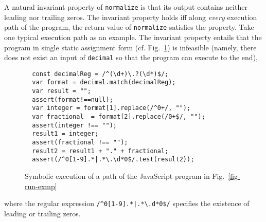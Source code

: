 A natural invariant property of {\tt normalize} is that its output contains neither leading nor trailing zeros. The invariant property holds iff  along \emph{every} execution path of the program, the return value of {\tt normalize} satisfies the property. 
%
Take one typical execution path as an example. %
The invariant property entails that the  program in single static assignment form (cf. Fig.~\ref{fig-run-exmp-path}) is infeasible (namely, there does not exist an input of {\tt decimal} so that the program can execute to the end), 
\begin{figure}[htbp]
\begin{center}
\begin{verbatim}
  const decimalReg = /^(\d+)\.?(\d*)$/;
  var format = decimal.match(decimalReg);
  var result = "";
  assert(format!==null);
  var integer = format[1].replace(/^0+/, "");
  var fractional  = format[2].replace(/0+$/, "");
  assert(integer !== ""); 
  result1 = integer;
  assert(fractional !== ""); 
  result2 = result1 + "." + fractional;
  assert(/^0[1-9].*|.*\.\d*0$/.test(result2));
\end{verbatim}
\end{center}
\label{fig-run-exmp-path}
\caption{Symbolic execution of a path of the JavaScript program in Fig.~\ref{fig-run-exmp}}
\end{figure}
where the regular expression {\tt /\^{}0[1-9].*|.*{\footnotesize\textbackslash}.d*0\$/} specifies the existence of leading or trailing zeros.

